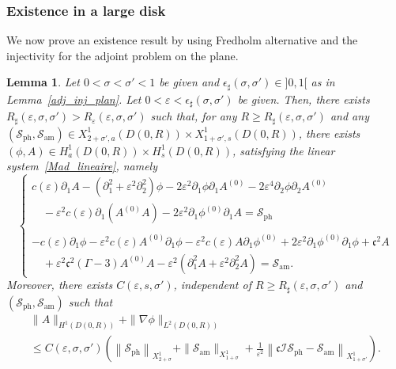 \documentclass[10pt]{amsart}
\newtheorem{lemm}[theo]{Lemma}\newtheorem{prop}[theo]{Proposition}\newtheorem{coro}[theo]{Corollary}\newtheorem{conj}[theo]{Conjecture}
\theoremstyle{definition}\newtheorem{defi}[theo]{Definition}\newtheorem{rema}[theo]{Remark}\newtheorem{exam}[theo]{Example}\newtheorem{exem}[theo]{Example}\newtheorem{nota}[theo]{Notation}
\newcommand*\p{\partial}
\newcommand{\amm}{\mathrm{am}}
\newcommand{\phl}{\mathrm{ph}}
\newcommand*\BI{\mathcal{I}}
\newcommand*\BS{\mathcal{S}}
\newcommand*\cs{{\mathfrak c}}
\newcommand*\gs{\geqslant }
\newcommand*\ls{\leqslant }
\newcommand*\e{\varepsilon}
\newcommand*\ep{\epsilon}
\newcommand*\s{\sigma}
\begin{document}
\subsubsection{Existence in a large disk}

We now prove an existence result by using Fredholm alternative and the injectivity for the adjoint problem on the plane.



\begin{lemm}\label{esti-apriori_disque2}
Let $ 0 < \s < \s' < 1 $ be given and $ \ep_\sharp (\s, \s') \in]0,1[$ as in Lemma~\ref{adj_inj_plan}. Let $ 0 < \e < \ep_\sharp (\s, \s') $ be given. Then, there exists $ R_\sharp(\e, \s, \s') > R_\e(\e, \s, \s') $ such that, for any $ R \gs R_\sharp(\e, \s, \s') $ and any $ (\BS_{\phl}, \BS_{\amm}) \in X^{1}_{2+\s', a} (D(0,R)) \times X^{1}_{1+\s', s} (D(0,R))$, there exists $ (\phi, A) \in H^{1}_a (D(0,R)) \times H^{1}_s (D(0,R)) $, satisfying the linear system~\eqref{Mad_lineaire}, namely
\begin{equation*}
\left\{
\begin{array}{ll}
c(\e) \p_{1} A - \left(\p_{1}^2 + \e^2 \p^2_{2}\right) \phi - 2 \e^2 \p_{1} \phi \p_{1} A^{(0)} - 2 \e^4 \p_{2} \phi \p_{2} A^{(0)}
\\
\quad - \e^2 c(\e) \p_1 \left(A^{(0)} A\right) - 2 \e^2 \p_{1} \phi^{(0)} \p_{1} A = \BS_{\phl} \\ \ \\
- c(\e) \p_{1} \phi - \e^2 c(\e) A^{(0)} \p_1 \phi - \e^2 c(\e) A \p_1 \phi^{(0)} + 2 \e^2 \p_{1} \phi^{(0)} \p_{1} \phi + \cs^2 A
\\
\quad + \e^2 \cs^2 (\Gamma -3) A^{(0)} A - \e^2 \left(\p_{1}^2 A + \e^2 \p_{2}^2 A\right) = \BS_{\amm}.
\end{array}\right.
\end{equation*}
Moreover, there exists $ C (\e, s, \s') $, independent of $ R \gs R_\sharp(\e, \s, \s') $ and $ (\BS_{\phl}, \BS_{\amm}) $ such that
\begin{multline*}
\| A \|_{ H^1 (D(0,R)) }  + \| \nabla \phi \|_{ L^2 (D(0,R)) }
\\ 
 \ls C (\e, \s, \s')
\left(
\left\| \BS_{\phl} \right\|_{ X^{1}_{ 2+\s } } + \| \BS_{\amm} \|_{ X^{ 1}_{1+\s} } + \frac{1}{\e^2} \left\| \cs \BI \BS_{\phl} - \BS_{\amm} \right\|_{ X^{1}_{1+\s'} }
\right).
\end{multline*}
\end{lemm}
\end{document}
